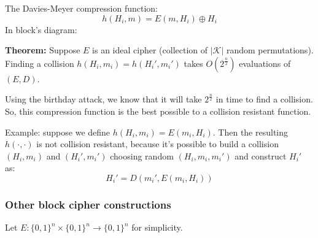 \documentclass[12pt]{book}
\newcommand{\Thm}{\textbf{Theorem:} }
\begin{document}
The Davies-Meyer compression function: $$h(H_{i},m)=E(m,H_{i})\oplus H_{i}$$
In block's diagram:
\begin{center}
\end{center}

\Thm Suppose $E$ is an ideal cipher (collection of $|\mathcal{K}|$ random permutations). Finding a collision $h(H_{i},m_{i})=h(H_{i}',m_{i}')$ takes $O(2^{\frac{n}{2}})$ evaluations of $(E,D)$.

Using the birthday attack, we know that it will take $2^{\frac{n}{2}}$ in time to find a collision. So, this compression function is the best possible to a collision resistant function.

Example: suppose we define $h(H_{i},m_{i})=E(m_{i},H_{i})$. Then the resulting $h(\cdot,\cdot)$ is not collision resistant, because it's possible to build a collision $(H_{i},m_{i})$ and $(H_{i}',m_{i}')$ choosing random $(H_{i},m_{i},m_{i}')$ and construct $H_{i}'$ as:
$$H_{i}'=D(m_{i}',E(m_{i},H_{i}))$$

\subsubsection{Other block cipher constructions}
Let $E:\{0,1\}^{n}\times\{0,1\}^{n}\rightarrow\{0,1\}^{n}$ for simplicity.
\end{document}
